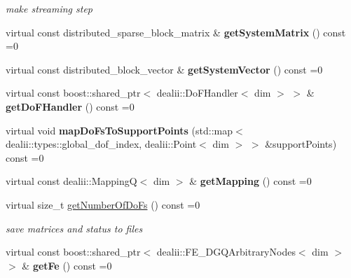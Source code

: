 \begin{DoxyCompactItemize}
\begin{DoxyCompactList}\small\item\em make streaming step \item\end{DoxyCompactList}\item 
\hypertarget{classnatrium_1_1AdvectionOperator_a2cbaee43740d976492e6c9d6d2b84ad0}{
virtual const distributed\_\-sparse\_\-block\_\-matrix \& {\bfseries getSystemMatrix} () const =0}
\label{classnatrium_1_1AdvectionOperator_a2cbaee43740d976492e6c9d6d2b84ad0}

\item 
\hypertarget{classnatrium_1_1AdvectionOperator_aa1eb5cd5a2c1b6b3b8f6395bac67ef55}{
virtual const distributed\_\-block\_\-vector \& {\bfseries getSystemVector} () const =0}
\label{classnatrium_1_1AdvectionOperator_aa1eb5cd5a2c1b6b3b8f6395bac67ef55}

\item 
\hypertarget{classnatrium_1_1AdvectionOperator_acf18a849f6d7b81083d1fee462f87500}{
virtual const boost::shared\_\-ptr$<$ dealii::DoFHandler$<$ dim $>$ $>$ \& {\bfseries getDoFHandler} () const =0}
\label{classnatrium_1_1AdvectionOperator_acf18a849f6d7b81083d1fee462f87500}

\item 
\hypertarget{classnatrium_1_1AdvectionOperator_a6171b5c645167a5e81f56964f1b9ae6f}{
virtual void {\bfseries mapDoFsToSupportPoints} (std::map$<$ dealii::types::global\_\-dof\_\-index, dealii::Point$<$ dim $>$ $>$ \&supportPoints) const =0}
\label{classnatrium_1_1AdvectionOperator_a6171b5c645167a5e81f56964f1b9ae6f}

\item 
\hypertarget{classnatrium_1_1AdvectionOperator_aa1c9d47c0cb17019bb122a4e45051ffa}{
virtual const dealii::MappingQ$<$ dim $>$ \& {\bfseries getMapping} () const =0}
\label{classnatrium_1_1AdvectionOperator_aa1c9d47c0cb17019bb122a4e45051ffa}

\item 
virtual size\_\-t \hyperlink{classnatrium_1_1AdvectionOperator_a251e21d1dd023926d4c5f7fd973b90bf}{getNumberOfDoFs} () const =0
\begin{DoxyCompactList}\small\item\em save matrices and status to files \item\end{DoxyCompactList}\item 
\hypertarget{classnatrium_1_1AdvectionOperator_ad282440d7dbee0e78f6489e9878d1b41}{
virtual const boost::shared\_\-ptr$<$ dealii::FE\_\-DGQArbitraryNodes$<$ dim $>$ $>$ \& {\bfseries getFe} () const =0}
\label{classnatrium_1_1AdvectionOperator_ad282440d7dbee0e78f6489e9878d1b41}


\end{DoxyCompactItemize}
